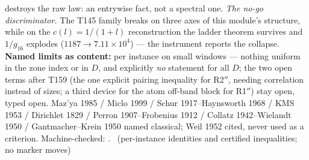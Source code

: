 \documentclass[11pt,a4paper]{article}
\theoremstyle{definition}
\begin{document}
destroys the raw law: an entrywise fact, not a spectral one.
\emph{The no-go discriminator.} The T145 family breaks on three axes of
this module's structure, while on the $c(l)=1/(1+l)$ reconstruction the
ladder theorem survives and $1/g_{16}$ explodes
($1187\to7.11\times10^{4}$) --- the instrument reports the collapse.
\textbf{Named limits as content:} per instance on small windows ---
nothing uniform in the zone index or in $D$, and explicitly \emph{no}
statement for all $D$; the two open terms after T159 (the one explicit
pairing inequality for R2$''$, needing correlation instead of sizes; a
third device for the atom off-band block for R1$''$) stay open, typed
open.
Maz'ya 1985 / Miclo 1999 / Schur 1917--Haynsworth 1968 / KMS 1953 /
Dirichlet 1829 / Perron 1907--Frobenius 1912 / Collatz 1942--Wielandt
1950 / Gantmacher--Krein 1950 named classical; Weil 1952 cited, never
used as a criterion.
Machine-checked:
.
\mE\ (per-instance identities and certified inequalities; no marker moves)
\end{document}
